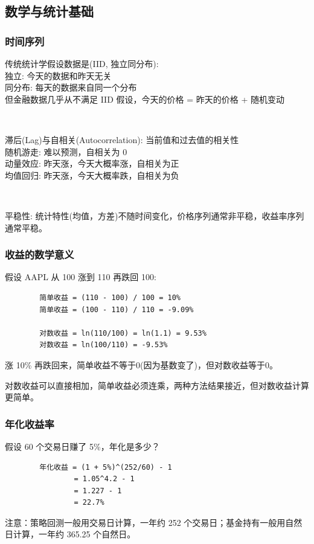 \subsection{数学与统计基础}

\begin{frame}
    \frametitle{时间序列}

    传统统计学假设数据是(\alert{IID, 独立同分布}): \\
    \hspace{2em} \alert{独立}: 今天的数据和昨天无关 \\
    \hspace{2em} \alert{同分布}: 每天的数据来自同一个分布 \\
    但金融数据几乎从不满足 IID 假设，今天的价格 = 昨天的价格 + 随机变动

    ~\par
    \alert{滞后(Lag)与自相关(Autocorrelation)}: 当前值和过去值的相关性 \\
    \hspace{2em} 随机游走: 难以预测，自相关为 0 \\
    \hspace{2em} 动量效应: 昨天涨，今天大概率涨，自相关为正 \\
    \hspace{2em} 均值回归: 昨天涨，今天大概率跌，自相关为负

    ~\par
    \alert{平稳性}: 统计特性(均值，方差)不随时间变化，价格序列通常非平稳，收益率序列通常平稳。

\end{frame}

\begin{frame}[fragile]
    \frametitle{收益的数学意义}

    假设 AAPL 从 100 涨到 110 再跌回 100: 
    \begin{verbatim}
        简单收益 = (110 - 100) / 100 = 10%
        简单收益 = (100 - 110) / 110 = -9.09%
        
        对数收益 = ln(110/100) = ln(1.1) = 9.53%
        对数收益 = ln(100/110) = -9.53%
    \end{verbatim}
    涨 10\% 再跌回来，简单收益不等于0(因为基数变了)，但对数收益等于0。

    对数收益可以直接相加，简单收益必须连乘，两种方法结果接近，但对数收益计算更简单。
\end{frame}

\begin{frame}[fragile]
    \frametitle{年化收益率}

    假设 60 个交易日赚了 5\%，年化是多少？
    \begin{verbatim}
        年化收益 = (1 + 5%)^(252/60) - 1
                = 1.05^4.2 - 1
                = 1.227 - 1
                = 22.7%
    \end{verbatim}

    注意：策略回测一般用交易日计算，一年约 252 个交易日；基金持有一般用自然日计算，一年约 365.25 个自然日。
    
\end{frame}

